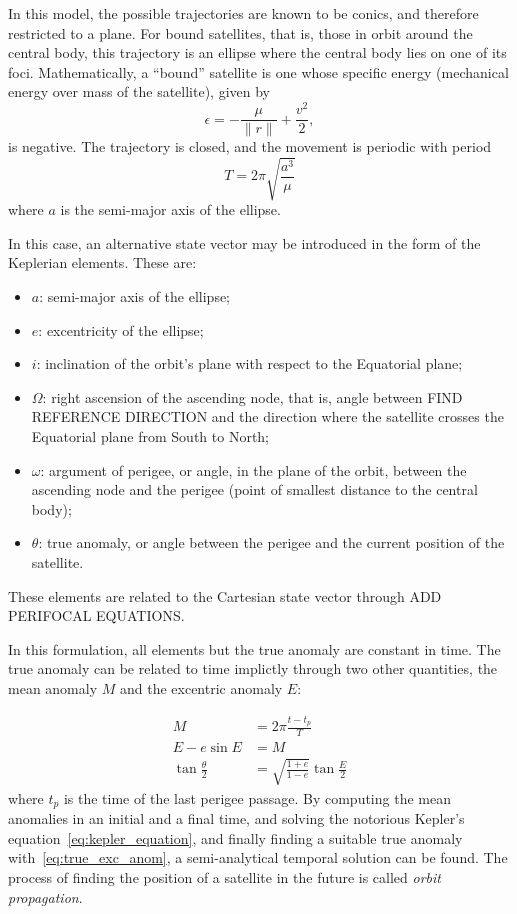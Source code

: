 In this model, the possible trajectories are known to be conics, and therefore restricted to a plane. For bound satellites, that is, those in orbit around the central body, this trajectory is an ellipse where the central body lies on one of its foci. Mathematically, a ``bound'' satellite is one whose specific energy (mechanical energy over mass of the satellite), given by
\begin{equation}
    \epsilon = -\frac{\mu}{\lVert r \rVert} + \frac{v^2}{2},
\end{equation}
is negative. The trajectory is closed, and the movement is periodic with period
\begin{equation}
    T = 2\pi \sqrt{\frac{a^3}{\mu}}
\end{equation}
where \(a\) is the semi-major axis of the ellipse.

In this case, an alternative state vector may be introduced in the form of the Keplerian elements. These are:
\begin{itemize}
    \item \(a\): semi-major axis of the ellipse;
    \item \(e\): excentricity of the ellipse;
    \item \(i\): inclination of the orbit's plane with respect to the Equatorial plane;
    \item \(\Omega \): right ascension of the ascending node, that is, angle between FIND REFERENCE DIRECTION and the direction where the satellite crosses the Equatorial plane from South to North;
    \item \(\omega \): argument of perigee, or angle, in the plane of the orbit, between the ascending node and the perigee (point of smallest distance to the central body);
    \item \(\theta \): true anomaly, or angle between the perigee and the current position of the satellite.
\end{itemize}

These elements are related to the Cartesian state vector through ADD PERIFOCAL EQUATIONS.

In this formulation, all elements but the true anomaly are constant in time. The true anomaly can be related to time implictly through two other quantities, the mean anomaly \(M\) and the excentric anomaly \(E\):

\begin{align} 
        M &= 2\pi \frac{t - t_p}{T} \\
        E - e \sin{E} &= M \label{eq:kepler_equation}\\
        \tan{\frac{\theta}{2}} &= \sqrt{\frac{1+e}{1-e}} \tan{\frac{E}{2}} \label{eq:true_exc_anom}
\end{align}
where \(t_p\) is the time of the last perigee passage. By computing the mean anomalies in an initial and a final time, and solving the notorious Kepler's equation~\eqref{eq:kepler_equation}, and finally finding a suitable true anomaly with~\eqref{eq:true_exc_anom}, a semi-analytical temporal solution can be found. The process of finding the position of a satellite in the future is called \textit{orbit propagation}.


